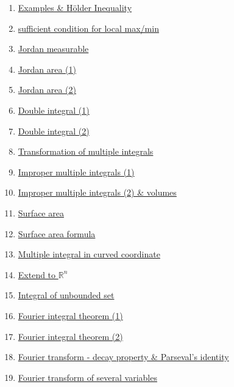 \documentclass[11pt]{article}
\begin{document}
\begin{enumerate}
	\item \href{https://mp.weixin.qq.com/s/YqrE_d7mOysPTEWr23AktQ}{Examples \& H{\"o}lder Inequality}	%
	\item \href{https://mp.weixin.qq.com/s/dvNVrNc2HOcP8KVPeCmgsQ}{sufficient condition for local max/min}	%
	\item \href{https://mp.weixin.qq.com/s/LTz6AxCJV6FeksnC4ymr4w}{Jordan measurable}	%
	\item \href{https://mp.weixin.qq.com/s/sL0OeOhB-uerhPBGkjvz8g}{Jordan area (1)}	%
	\item \href{https://mp.weixin.qq.com/s/3lNhydWx_bMVwgs0m8sb7g}{Jordan area (2)}	%
	\item \href{https://mp.weixin.qq.com/s/MN9H1f2uwMYlUEp26NqE6w}{Double integral (1)}	%
	\item \href{https://mp.weixin.qq.com/s/w0_3AgvhZfBsGPhNRXFP1g}{Double integral (2)}	%
	\item \href{https://mp.weixin.qq.com/s/SAdVbMScJP8I3rQ3XmVwOw}{Transformation of multiple integrals}	%
	\item \href{https://mp.weixin.qq.com/s/kob2IvplxCmKFTtFpbNA_g}{Improper multiple integrals (1)}	%
	\item \href{https://mp.weixin.qq.com/s/ZdR6BpqL_kikazr7yh6gGg}{Improper multiple integrals (2) \& volumes}	%
	\item \href{https://mp.weixin.qq.com/s/Abi6Lf2Xjw5a1oDwvW5usg}{Surface area}	%
	\item \href{https://mp.weixin.qq.com/s/R4mn26dgB2_MeQqIOgg-OA}{Surface area formula}	%
	\item \href{https://mp.weixin.qq.com/s/rhMCKrdEWJqkRj0kafOJ8Q}{Multiple integral in curved coordinate}	%
	\item \href{https://mp.weixin.qq.com/s/FnoVINT35kZ8b9a7IL310Q}{Extend to $\mathbb{R}^n$}	%
	\item \href{https://mp.weixin.qq.com/s/ylmcO7WRa39DSbEk7KysxQ}{Integral of unbounded set}	%
	\item \href{https://mp.weixin.qq.com/s/0a73qNWFZvH7FKEb685vXQ}{Fourier integral theorem (1)}	%
	\item \href{https://mp.weixin.qq.com/s/FFCguuWwUYZTmuw0sGv2Gg}{Fourier integral theorem (2)}	%
	\item \href{https://mp.weixin.qq.com/s/C1RIlDACuV_jDDrVUP1sqg}{Fourier transform - decay property \& Parseval's identity}	%
	\item \href{https://mp.weixin.qq.com/s/j3bD1spNfFUMvLIBohfteg}{Fourier transform of several variables}	%

\end{enumerate}
\end{document}
